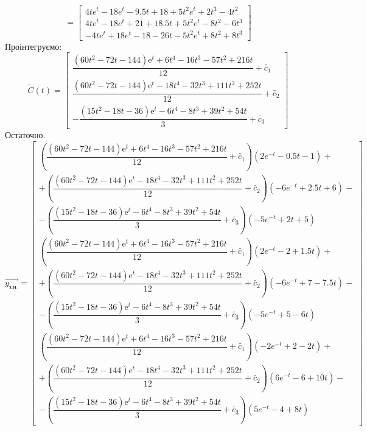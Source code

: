 \documentclass[14pt,a4paper]{scrartcl}
\theoremstyle{definition}
\theoremstyle{remark}
\theoremstyle{definition}
\theoremstyle{definition}
\begin{document}
$$
=  \begin{bmatrix}
 4te^{t} -18 e^{t} - 9.5t + 18 + 5t^2 e^{t} +2t^3 -4t^2 \\
 4te^{t}  -18 e^{t} +21 +18.5t   +5t^2 e^{t} -8t^2 -6t^3 \\
 -4t e^{t}   + 18 e^{t} -18 -26t    -5t^2 e^{t} +8t^2 + 8 t^3
\end{bmatrix}
$$
Проінтегруємо:
$$
\tilde{C}(t) = \begin{bmatrix}
\dfrac{\left(60t^2-72t-144\right)\mathrm{e}^t+6t^4-16t^3-57t^2+216t}{12} + \tilde{c_1}\\
\dfrac{\left(60t^2-72t-144\right)\mathrm{e}^t-18t^4-32t^3+111t^2+252t}{12}+ \tilde{c_2}\\
-\dfrac{\left(15t^2-18t-36\right)\mathrm{e}^t-6t^4-8t^3+39t^2+54t}{3} + \tilde{c_3}
\end{bmatrix}
$$
Остаточно.
$$
\vec{y_{\text{з.н.}}} = \begin{bmatrix}
\left( \dfrac{\left(60t^2-72t-144\right)\mathrm{e}^t+6t^4-16t^3-57t^2+216t}{12} + \tilde{c_1} \right) ( 2e^{-t} -0.5t - 1 ) +\\ + (\dfrac{\left(60t^2-72t-144\right)\mathrm{e}^t-18t^4-32t^3+111t^2+252t}{12}+ \tilde{c_2}) (-6 e^{-t} + 2.5t + 6 ) - \\ - \left( \dfrac{\left(15t^2-18t-36\right)\mathrm{e}^t-6t^4-8t^3+39t^2+54t}{3} + \tilde{c_3} \right)  ( -5 e^{-t} +2t +5) \\
 \left( \dfrac{\left(60t^2-72t-144\right)\mathrm{e}^t+6t^4-16t^3-57t^2+216t}{12} + \tilde{c_1} \right) (2 e^{-t} -2 + 1.5t) + \\ + (\dfrac{\left(60t^2-72t-144\right)\mathrm{e}^t-18t^4-32t^3+111t^2+252t}{12}+ \tilde{c_2}) (-6 e^{-t} +7 -7.5t)   - \\ - \left( \dfrac{\left(15t^2-18t-36\right)\mathrm{e}^t-6t^4-8t^3+39t^2+54t}{3} + \tilde{c_3} \right)  (-5 e^{-t} +5 -6t) \\
 \left( \dfrac{\left(60t^2-72t-144\right)\mathrm{e}^t+6t^4-16t^3-57t^2+216t}{12} + \tilde{c_1} \right) (-2 e^{-t} +2 -2t  ) + \\ + (\dfrac{\left(60t^2-72t-144\right)\mathrm{e}^t-18t^4-32t^3+111t^2+252t}{12}+ \tilde{c_2}) (6 e^{-t} -6 +10t)  -\\ - \left( \dfrac{\left(15t^2-18t-36\right)\mathrm{e}^t-6t^4-8t^3+39t^2+54t}{3} + \tilde{c_3} \right)  ( 5 e^{-t} -4 + 8 t)
\end{bmatrix}
$$
\end{document}
